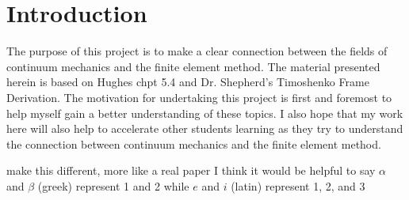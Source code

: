 \section{Introduction}

The purpose of this project is to make a clear connection between the fields of continuum mechanics and the finite element method. 
The material presented herein is based on Hughes chpt 5.4 and Dr. Shepherd's Timoshenko Frame Derivation.
The motivation for undertaking this project is first and foremost to help myself gain a better understanding of these topics. 
I also hope that my work here will also help to accelerate other students learning as they try to understand the connection between continuum mechanics and the finite element method. 

{\Rd make this different, more like a real paper}
I think it would be helpful to say $\alpha$ and $\beta$ (greek) represent 1 and 2 while $e$ and $i$ (latin) represent 1, 2, and 3